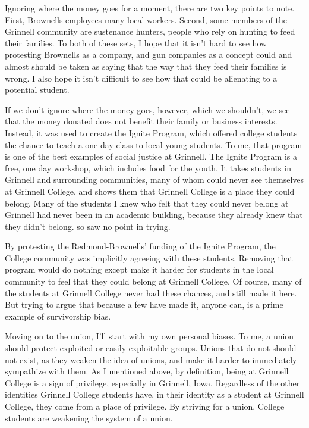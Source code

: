 \documentclass[12pt]{article}[titlepage]
\newcommand{\1}{\={a}}
\newcommand{\2}{\={e}}
\newcommand{\3}{\={\i}}
\newcommand{\4}{\=o}
\newcommand{\5}{\=u}
\newcommand{\6}{\={A}}
\renewcommand{\,}{\textsuperscript{,}}
\begin{document}
Ignoring where the money goes for a moment, there are two key points to note.
First, Brownells employees many local workers.
Second, some members of the Grinnell community are sustenance hunters, people who rely on hunting to feed their families.
To both of these sets, I hope that it isn't hard to see how protesting Brownells as a company, and gun companies as a concept could and almost should be taken as saying that the way that they feed their families is wrong.
I also hope it isn't difficult to see how that could be alienating to a potential student.

If we don't ignore where the money goes, however, which we shouldn't, we see that the money donated does not benefit their family or business interests.
Instead, it was used to create the Ignite Program, which offered college students the chance to teach a one day class to local young students.
To me, that program is one of the best examples of social justice at Grinnell.
The Ignite Program is a free, one day workshop, which includes food for the youth.
It takes students in Grinnell and surrounding communities, many of whom could never see themselves at Grinnell College, and shows them that Grinnell College is a place they could belong.
Many of the students I knew who felt that they could never belong at Grinnell had never been in an academic building, because they already knew that they didn't belong. so saw no point in trying.

By protesting the Redmond-Brownells' funding of the Ignite Program, the College community was implicitly agreeing with these students.
Removing that program would do nothing except make it harder for students in the local community to feel that they could belong at Grinnell College.
Of course, many of the students at Grinnell College never had these chances, and still made it here.
But trying to argue that because a few have made it, anyone can, is a prime example of survivorship bias.

Moving on to the union, I'll start with my own personal biases.
To me, a union should protect exploited or easily exploitable groups.
Unions that do not should not exist, as they weaken the idea of unions, and make it harder to immediately sympathize with them.
As I mentioned above, by definition, being at Grinnell College is a sign of privilege, especially in Grinnell, Iowa.
Regardless of the other identities Grinnell College students have, in their identity as a student at Grinnell College, they come from a place of privilege.
By striving for a union, College students are weakening the system of a union.
\end{document}
